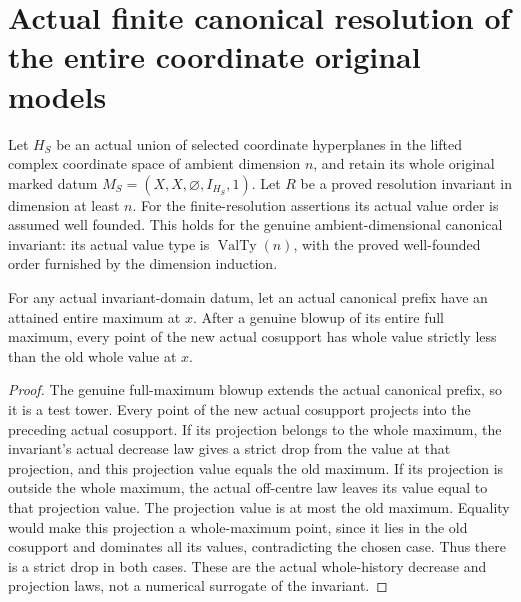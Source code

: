 \section{Actual finite canonical resolution of the entire coordinate original models}
\label{sec:hironaka-homogeneous-canonical-resolution}

Let $H_S$ be an actual union of selected coordinate hyperplanes in the
lifted complex coordinate space of ambient dimension $n$, and retain
its whole original marked datum $M_S=(X,X,\varnothing,I_{H_S},1)$.
Let $R$ be a proved resolution invariant in dimension at least $n$.
For the finite-resolution assertions its actual value order is assumed
well founded. This holds for the genuine ambient-dimensional canonical
invariant: its actual value type is $\operatorname{ValTy}(n)$, with the
proved well-founded order furnished by the dimension induction.

\begin{lemma}
\label{hir:homogeneous-actual-whole-maximum-strict-progress}
For any actual invariant-domain datum, let an actual canonical prefix
have an attained entire maximum at $x$. After a genuine blowup of its
entire full maximum, every point of the new actual cosupport has whole
value strictly less than the old whole value at $x$.
\leanok
{}
\end{lemma}
\begin{proof}
The genuine full-maximum blowup extends the actual canonical prefix, so
it is a test tower. Every point of the new actual cosupport projects
into the preceding actual cosupport. If its projection belongs to the
whole maximum, the invariant's actual decrease law gives a strict drop
from the value at that projection, and this projection value equals
the old maximum. If its projection is outside the whole maximum, the
actual off-centre law leaves its value equal to that projection value.
The projection value is at most the old maximum. Equality would make
this projection a whole-maximum point, since it lies in the old
cosupport and dominates all its values, contradicting the chosen
case. Thus there is a strict drop in both cases. These are the actual
whole-history decrease and projection laws, not a numerical surrogate
of the invariant.
\end{proof}

